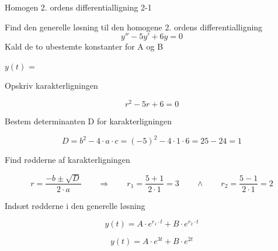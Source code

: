\documentclass{article}
\begin{document}
\newpage

\begin{exercise}{Homogen 2. ordens differentialligning 2-1}

Find den generelle løsning til den homogene 2. ordens differentialligning
\[
y'' - 5y' + 6y = 0
\]
Kald de to ubestemte konstanter for A og B

$y(t)$ = 


\hint

Opskriv karakterligningen

\hint

\[
r^2 - 5r + 6 = 0
\]


\hint

Bestem determinanten D for karakterligningen


\hint
\[
D = b^2 - 4 \cdot a \cdot c = (-5)^2 - 4 \cdot 1 \cdot 6 = 25 - 24 = 1
\]

\hint
Find rødderne af karakterligningen


\hint

\[
r = \frac{-b \pm \sqrt{D}}{2 \cdot a} \qquad \Rightarrow \qquad r_1 = \frac{5 + 1}{2 \cdot 1} = 3 \qquad \wedge \qquad r_2 = \frac{5 - 1}{2 \cdot 1} = 2
\]

\hint

Indsæt rødderne i den generelle løsning

\hint
\[
y(t) = A \cdot e^{r_1 \cdot t} + B \cdot e^{r_2\cdot t}
\]

\hint

\[
y(t) = A \cdot e^{3t} + B \cdot e^{2t}
\]


\end{exercise}

\newpage
\end{document}

